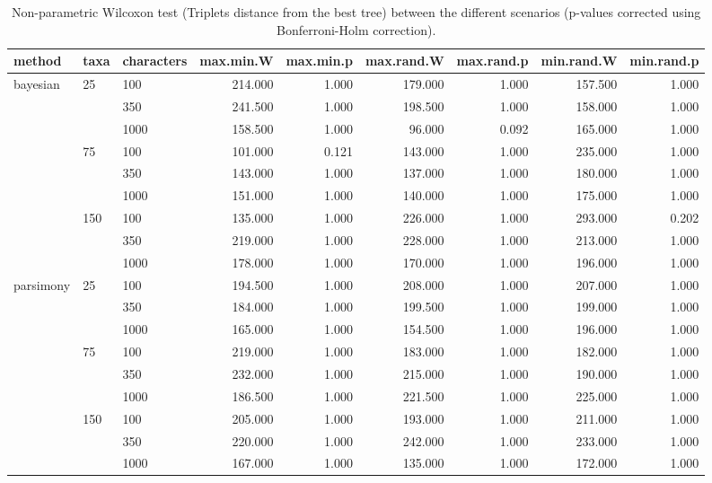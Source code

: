 \begin{table}[ht]
\centering
\begin{tabular}{lllrrrrrr}
  \hline
method & taxa & characters & max.min.W & max.min.p & max.rand.W & max.rand.p & min.rand.W & min.rand.p \\ 
  \hline
bayesian & 25 & 100 & 214.000 & 1.000 & 179.000 & 1.000 & 157.500 & 1.000 \\ 
   &  & 350 & 241.500 & 1.000 & 198.500 & 1.000 & 158.000 & 1.000 \\ 
   &  & 1000 & 158.500 & 1.000 & 96.000 & 0.092 & 165.000 & 1.000 \\ 
   & 75 & 100 & 101.000 & 0.121 & 143.000 & 1.000 & 235.000 & 1.000 \\ 
   &  & 350 & 143.000 & 1.000 & 137.000 & 1.000 & 180.000 & 1.000 \\ 
   &  & 1000 & 151.000 & 1.000 & 140.000 & 1.000 & 175.000 & 1.000 \\ 
   & 150 & 100 & 135.000 & 1.000 & 226.000 & 1.000 & 293.000 & 0.202 \\ 
   &  & 350 & 219.000 & 1.000 & 228.000 & 1.000 & 213.000 & 1.000 \\ 
   &  & 1000 & 178.000 & 1.000 & 170.000 & 1.000 & 196.000 & 1.000 \\ 
  parsimony & 25 & 100 & 194.500 & 1.000 & 208.000 & 1.000 & 207.000 & 1.000 \\ 
   &  & 350 & 184.000 & 1.000 & 199.500 & 1.000 & 199.000 & 1.000 \\ 
   &  & 1000 & 165.000 & 1.000 & 154.500 & 1.000 & 196.000 & 1.000 \\ 
   & 75 & 100 & 219.000 & 1.000 & 183.000 & 1.000 & 182.000 & 1.000 \\ 
   &  & 350 & 232.000 & 1.000 & 215.000 & 1.000 & 190.000 & 1.000 \\ 
   &  & 1000 & 186.500 & 1.000 & 221.500 & 1.000 & 225.000 & 1.000 \\ 
   & 150 & 100 & 205.000 & 1.000 & 193.000 & 1.000 & 211.000 & 1.000 \\ 
   &  & 350 & 220.000 & 1.000 & 242.000 & 1.000 & 233.000 & 1.000 \\ 
   &  & 1000 & 167.000 & 1.000 & 135.000 & 1.000 & 172.000 & 1.000 \\ 
   \hline
\end{tabular}
\caption{Non-parametric Wilcoxon test (Triplets distance from the best tree) between the different scenarios (p-values corrected using Bonferroni-Holm correction).} 
\label{Tab_BCTrbest}
\end{table}
